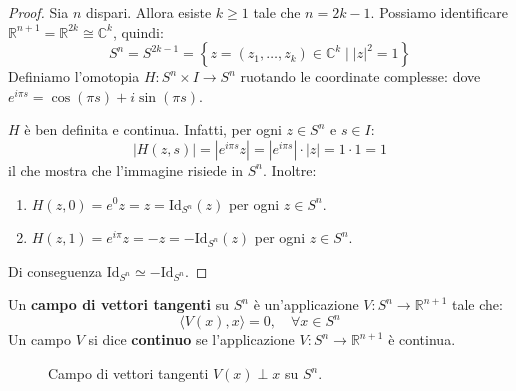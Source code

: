 \begin{proof}
Sia $n$ dispari. Allora esiste $k \geqslant 1$ tale che $n = 2k - 1$. Possiamo identificare $\mathbb{R}^{n+1} = \mathbb{R}^{2k} \cong \mathbb{C}^k$, quindi:
\[
S^n = S^{2k-1} = \left\{ z = (z_1, \dots, z_k) \in \mathbb{C}^k \mid |z|^2 = 1 \right\}
\]
Definiamo l'omotopia $H: S^n \times I \to S^n$ ruotando le coordinate complesse:
dove $e^{i\pi s} = \cos(\pi s) + i\sin(\pi s)$.

$H$ è ben definita e continua. Infatti, per ogni $z \in S^n$ e $s \in I$:
\[
|H(z,s)| = |e^{i\pi s} z| = |e^{i\pi s}| \cdot |z| = 1 \cdot 1 = 1
\]
il che mostra che l'immagine risiede in $S^n$. Inoltre:
\begin{enumerate}[label=\roman*)]
    \item $H(z,0) = e^0 z = z = \mathrm{Id}_{S^n}(z)$ per ogni $z \in S^n$.
    \item $H(z,1) = e^{i\pi} z = -z = -\mathrm{Id}_{S^n}(z)$ per ogni $z \in S^n$.
\end{enumerate}
Di conseguenza $\mathrm{Id}_{S^n} \simeq -\mathrm{Id}_{S^n}$.
\end{proof}

\vspace{1.5em}

\begin{definicion}
Un \textbf{campo di vettori tangenti} su $S^n$ è un'applicazione $V: S^n \to \mathbb{R}^{n+1}$ tale che:
\[
\langle V(x), x \rangle = 0, \quad \forall x \in S^n
\]
Un campo $V$ si dice \textbf{continuo} se l'applicazione $V: S^n \to \mathbb{R}^{n+1}$ è continua.
\end{definicion}

\begin{figure}[H]
    \centering
    \caption{Campo di vettori tangenti $V(x) \perp x$ su $S^n$.}
\end{figure}

